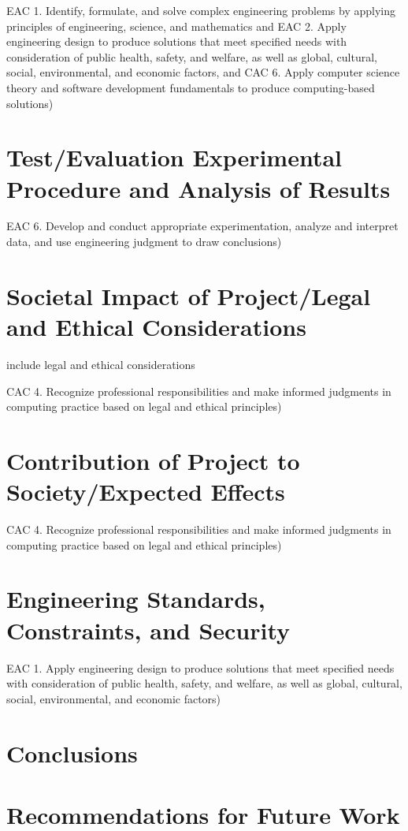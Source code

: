 \documentclass{article}
\begin{document}
EAC 1. Identify, formulate, and solve complex engineering problems by 
applying principles of engineering, science, and mathematics and EAC 2. 
Apply engineering design to produce solutions that meet specified needs with 
consideration of public health, safety, and welfare, as well as global, cultural, 
social, environmental, and economic factors, and CAC 6. Apply computer 
science theory and software development fundamentals to produce 
computing-based solutions) 

\section{Test/Evaluation Experimental Procedure and Analysis of Results} 
EAC 6. Develop and conduct appropriate experimentation, analyze and interpret 
data, and use engineering judgment to draw conclusions) 

\section{Societal Impact of Project\slash Legal and Ethical Considerations} 
include legal and ethical considerations 

CAC 4. Recognize professional responsibilities and make informed judgments in 
computing practice based on legal and ethical principles) 

\section{Contribution of Project to Society\slash Expected Effects}
CAC 4. Recognize professional responsibilities and make informed judgments in 
computing practice based on legal and ethical principles) 

\section{Engineering Standards, Constraints, and Security}
EAC 1. Apply engineering design to produce solutions that meet specified needs with consideration of public health, 
safety, and welfare, as well as global, cultural, social, environmental, and economic 
factors) 
\section{Conclusions}

\section{Recommendations for Future Work}
\end{document}
